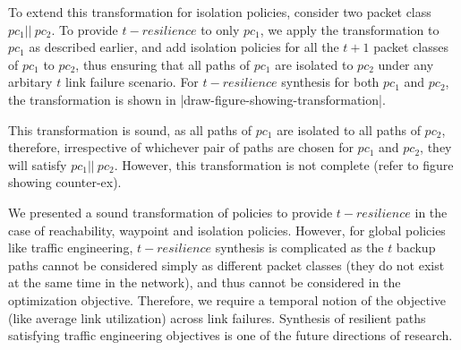 To extend this transformation for isolation policies, consider two packet class $pc_1 ||\ pc_2$. 
To provide $t-resilience$ to only $pc_1$, we apply the transformation to $pc_1$ as described
earlier, and add isolation policies for all the $t+1$ packet classes of $pc_1$ to $pc_2$,
thus ensuring that all paths of $pc_1$ are isolated to $pc_2$ under any arbitary $t$ link 
failure scenario. For $t-resilience$ synthesis for both $pc_1$ and $pc_2$, the transformation
is shown in |draw-figure-showing-transformation|.

This transformation is sound, as all paths of $pc_1$ are isolated to all paths of $pc_2$,
therefore, irrespective of whichever pair of paths are chosen for $pc_1$ and $pc_2$,
they will satisfy $pc_1 || \ pc_2$. However, this transformation is not complete (refer to 
figure showing counter-ex). 

We presented a sound transformation of policies to provide $t-resilience$ in
the case of reachability, waypoint and isolation policies. However, for global policies like 
traffic engineering, $t-resilience$ synthesis is complicated as the $t$ backup paths 
cannot be considered simply as different packet classes (they do not exist at the same time
in the network),
and thus cannot be considered in the optimization objective. Therefore, we require a 
temporal notion of the objective (like average link utilization) across link failures. Synthesis of resilient paths
satisfying traffic engineering objectives is one of the future directions of research.